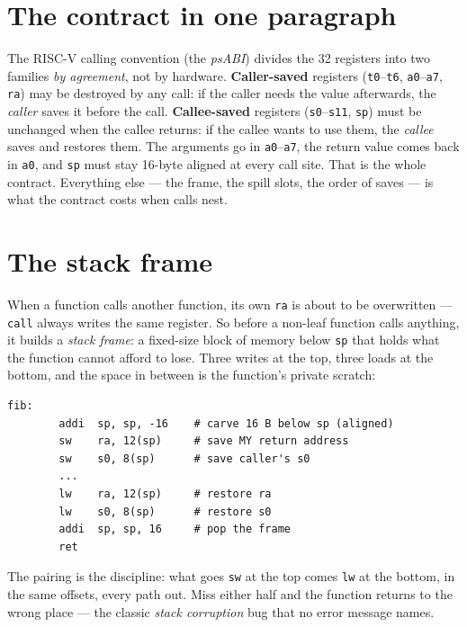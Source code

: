 \section{The contract in one paragraph}
\label{sec:contract04}

The RISC-V calling convention (the \emph{psABI}) divides the 32
registers into two families \emph{by agreement}, not by hardware.
\textbf{Caller-saved} registers (\texttt{t0}--\texttt{t6},
\texttt{a0}--\texttt{a7}, \texttt{ra}) may be destroyed by any call:
if the caller needs the value afterwards, the \emph{caller} saves it
before the call. \textbf{Callee-saved} registers (\texttt{s0}--\texttt{s11},
\texttt{sp}) must be unchanged when the callee returns: if the callee
wants to use them, the \emph{callee} saves and restores them. The
arguments go in \texttt{a0}--\texttt{a7}, the return value comes back
in \texttt{a0}, and \texttt{sp} must stay 16-byte aligned at every
call site. That is the whole contract. Everything else --- the frame,
the spill slots, the order of saves --- is what the contract costs
when calls nest.

\section{The stack frame}
\label{sec:frame04}

When a function calls another function, its own \texttt{ra} is about
to be overwritten --- \texttt{call} always writes the same register.
So before a non-leaf function calls anything, it builds a
\emph{stack frame}: a fixed-size block of memory below \texttt{sp}
that holds what the function cannot afford to lose. Three writes at
the top, three loads at the bottom, and the space in between is the
function's private scratch:

\begin{lstlisting}
fib:
        addi  sp, sp, -16    # carve 16 B below sp (aligned)
        sw    ra, 12(sp)     # save MY return address
        sw    s0, 8(sp)      # save caller's s0
        ...
        lw    ra, 12(sp)     # restore ra
        lw    s0, 8(sp)      # restore s0
        addi  sp, sp, 16     # pop the frame
        ret
\end{lstlisting}

The pairing is the discipline: what goes \texttt{sw} at the top comes
\texttt{lw} at the bottom, in the same offsets, every path out. Miss
either half and the function returns to the wrong place --- the
classic \emph{stack corruption} bug that no error message names.

